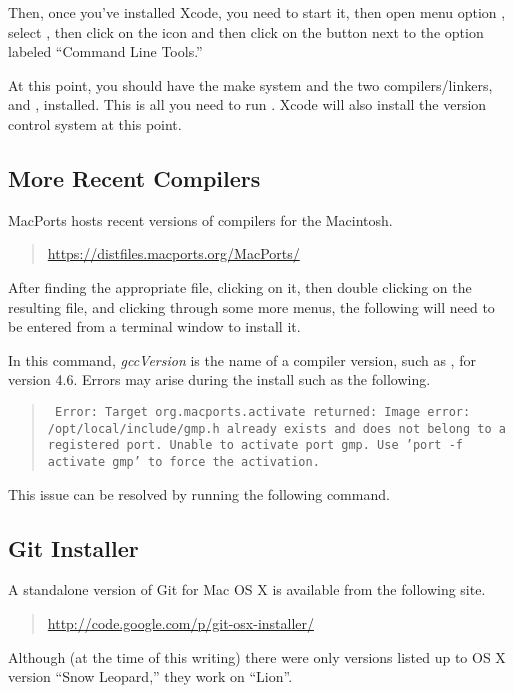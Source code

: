 Then, once you've installed Xcode, you need to start it, then open
menu option , select , then click on the
 icon and then click on the  button next
to the option labeled ``Command Line Tools.''

At this point, you should have the make system  and the two
\Cpp compilers/linkers, \gpp and \clang, installed.  This is all you
need to run \Stan.  Xcode will also install the  version
control system at this point.

\subsection{More Recent Compilers}

MacPorts hosts recent versions of compilers for the Macintosh.
%
\begin{quote}
\url{https://distfiles.macports.org/MacPorts/}
\end{quote}
%
After finding the appropriate  file, clicking on it, then
double clicking on the resulting  file, and clicking
through some more menus, the following will need to be entered from a
terminal window to install it.
%
\begin{quote}
\end{quote}
%
In this command, {\slshape gccVersion} is the name of a compiler
version, such as , for version 4.6.  Errors may arise
during the install such as the following.
%
\begin{quote}\small\tt
  Error: Target org.macports.activate returned: Image error:
  /opt/local/include/gmp.h already exists and does not belong to a
  registered port.  Unable to activate port gmp. Use 'port -f activate
  gmp' to force the activation.
\end{quote}
%
This issue can be resolved by running the following command.
%
\begin{quote}
\end{quote}
%


\subsection{Git Installer}

A standalone version of Git for Mac OS X is available from the
following site. 
%
\begin{quote}
\url{http://code.google.com/p/git-osx-installer/}
\end{quote}
%
Although (at the time of this writing) there were only versions listed
up to OS X version ``Snow Leopard,'' they work on ``Lion''.


